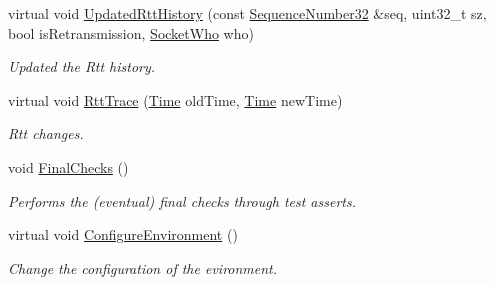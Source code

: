 \begin{DoxyCompactItemize}
virtual void \hyperlink{classTcpRttEstimationTest_aa27a4399fbfaeb029a05357c3b83c292}{Updated\+Rtt\+History} (const \hyperlink{group__network_gacb2070e4e98d2d5135c9bede58f07a03}{Sequence\+Number32} \&seq, uint32\+\_\+t sz, bool is\+Retransmission, \hyperlink{classns3_1_1TcpGeneralTest_a29338e6b7137cad650c2ff835713f6ee}{Socket\+Who} who)
\begin{DoxyCompactList}\small\item\em Updated the Rtt history. \end{DoxyCompactList}\item 
virtual void \hyperlink{classTcpRttEstimationTest_a6ee6478809b03802883fe70ff61a5816}{Rtt\+Trace} (\hyperlink{classns3_1_1Time}{Time} old\+Time, \hyperlink{classns3_1_1Time}{Time} new\+Time)
\begin{DoxyCompactList}\small\item\em Rtt changes. \end{DoxyCompactList}\item 
void \hyperlink{classTcpRttEstimationTest_af57fb1c07f68644231c4c1d9b81ebaf6}{Final\+Checks} ()
\begin{DoxyCompactList}\small\item\em Performs the (eventual) final checks through test asserts. \end{DoxyCompactList}\item 
virtual void \hyperlink{classTcpRttEstimationTest_a2f03b64bf5e45e2c66446fe8887685a2}{Configure\+Environment} ()
\begin{DoxyCompactList}\small\item\em Change the configuration of the evironment. \end{DoxyCompactList}\end{DoxyCompactItemize}
